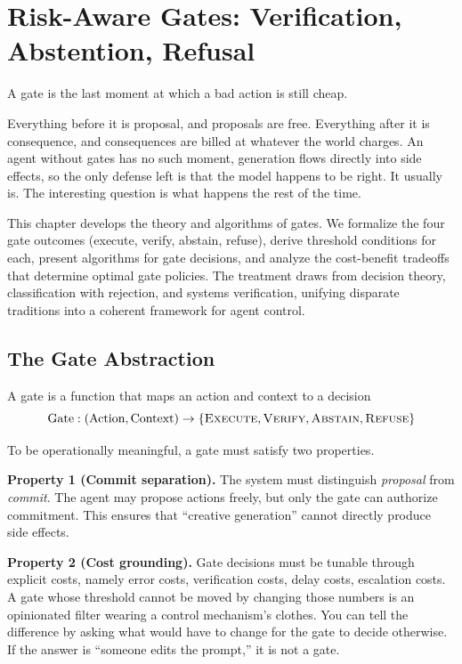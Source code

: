 \chapter{Risk-Aware Gates: Verification, Abstention, Refusal}
\label{ch:gates}

A gate is the last moment at which a bad action is still cheap.

Everything before it is proposal, and proposals are free. Everything after it is
consequence, and consequences are billed at whatever the world charges. An agent
without gates has no such moment, generation flows directly into side effects,
so the only defense left is that the model happens to be right. It usually is.
The interesting question is what happens the rest of the time.

This chapter develops the theory and algorithms of gates. We formalize the four gate outcomes (execute, verify, abstain, refuse), derive threshold conditions for each, present algorithms for gate decisions, and analyze the cost-benefit tradeoffs that determine optimal gate policies. The treatment draws from decision theory, classification with rejection, and systems verification, unifying disparate traditions into a coherent framework for agent control.

\section{The Gate Abstraction}

A gate is a function that maps an action and context to a decision
\[
\text{Gate}: (\text{Action}, \text{Context}) \rightarrow \{\textsc{Execute}, \textsc{Verify}, \textsc{Abstain}, \textsc{Refuse}\}
\]

To be operationally meaningful, a gate must satisfy two properties.

\textbf{Property 1 (Commit separation).} The system must distinguish \emph{proposal} from \emph{commit}. The agent may propose actions freely, but only the gate can authorize commitment. This ensures that ``creative generation'' cannot directly produce side effects.

\textbf{Property 2 (Cost grounding).} Gate decisions must be tunable through
explicit costs, namely error costs, verification costs, delay costs, escalation costs.
A gate whose threshold cannot be moved by changing those numbers is an opinionated
filter wearing a control mechanism's clothes. You can tell the difference by
asking what would have to change for the gate to decide otherwise. If the answer
is ``someone edits the prompt,'' it is not a gate.

